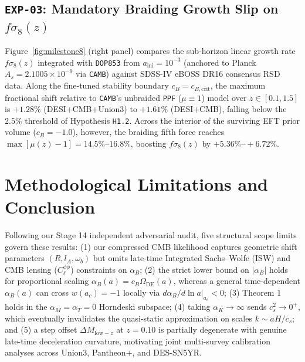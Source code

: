 \documentclass[11pt,a4paper]{article}
\begin{document}
\subsection{\texttt{EXP-03}: Mandatory Braiding Growth Slip on $f\sigma_8(z)$}
Figure~\ref{fig:milestone8} (right panel) compares the sub-horizon linear growth rate $f\sigma_8(z)$ integrated with \texttt{DOP853} from $a_{\mathrm{ini}} = 10^{-3}$ (anchored to Planck $A_s = 2.1005 \times 10^{-9}$ via \texttt{CAMB}) against SDSS-IV eBOSS DR16 consensus RSD data. Along the fine-tuned stability boundary $c_B = c_{B,\mathrm{crit}}$, the maximum fractional shift relative to \texttt{CAMB}'s unbraided \texttt{PPF} ($\mu \equiv 1$) model over $z \in [0.1, 1.5]$ is $+1.28\%$ (DESI+CMB+Union3) to $+1.61\%$ (DESI+CMB), falling below the $2.5\%$ threshold of Hypothesis \texttt{H1.2}. Across the interior of the surviving EFT prior volume ($c_B = -1.0$), however, the braiding fifth force reaches $\max[\mu(z)-1] = 14.5\%\text{--}16.8\%$, boosting $f\sigma_8(z)$ by $+5.36\%\text{--}+6.72\%$.

\section{Methodological Limitations and Conclusion}
Following our Stage 14 independent adversarial audit, five structural scope limits govern these results: (1) our compressed CMB likelihood captures geometric shift parameters $(R, l_A, \omega_b)$ but omits late-time Integrated Sachs--Wolfe (ISW) and CMB lensing ($C_\ell^{\phi\phi}$) constraints on $\alpha_B$; (2) the strict lower bound on $|\alpha_B|$ holds for proportional scaling $\alpha_B(a) = c_B \Omega_{\mathrm{DE}}(a)$, whereas a general time-dependent $\alpha_B(a)$ can cross $w(a_c) = -1$ locally via $d\alpha_B/d\ln a|_{a_c} < 0$; (3) Theorem 1 holds in the $\alpha_M = \alpha_T = 0$ Horndeski subspace; (4) taking $\alpha_K \to \infty$ sends $c_s^2 \to 0^+$, which eventually invalidates the quasi-static approximation on scales $k \sim aH/c_s$; and (5) a step offset $\Delta M_{\mathrm{low-}z}$ at $z = 0.10$ is partially degenerate with genuine late-time deceleration curvature, motivating joint multi-survey calibration analyses across Union3, Pantheon+, and DES-SN5YR.



\end{document}

